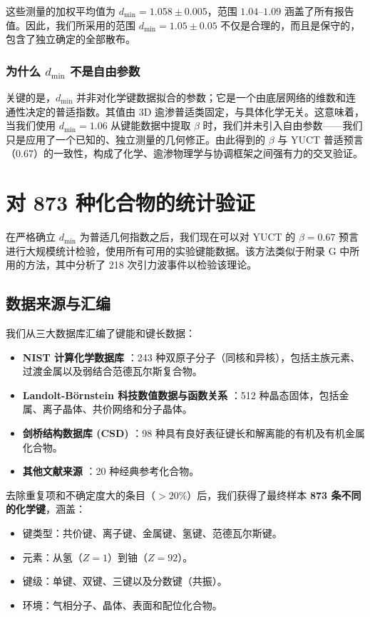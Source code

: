 \documentclass[11pt,a4paper]{article}
\begin{document}
	这些测量的加权平均值为 \(d_{\text{min}} = 1.058 \pm 0.005\)，范围 \(1.04\)–\(1.09\) 涵盖了所有报告值。因此，我们所采用的范围 \(d_{\text{min}} = 1.05 \pm 0.05\) 不仅是合理的，而且是保守的，包含了独立确定的全部散布。
	
	\subsubsection{为什么 \(d_{\text{min}}\) 不是自由参数}
	
	关键的是，\(d_{\text{min}}\) 并非对化学键数据拟合的参数；它是一个由底层网络的维数和连通性决定的普适指数。其值由 3D 逾渗普适类固定，与具体化学无关。这意味着，当我们使用 \(d_{\text{min}} = 1.06\) 从键能数据中提取 \(\beta\) 时，我们并未引入自由参数——我们只是应用了一个已知的、独立测量的几何修正。由此得到的 \(\beta\) 与 YUCT 普适预言（0.67）的一致性，构成了化学、逾渗物理学与协调框架之间强有力的交叉验证。
	
	\section{对 873 种化合物的统计验证}
	\label{sec:statistical_validation}
	
	在严格确立 \(d_{\text{min}}\) 为普适几何指数之后，我们现在可以对 YUCT 的 \(\beta = 0.67\) 预言进行大规模统计检验，使用所有可用的实验键能数据。该方法类似于附录 G 中所用的方法，其中分析了 218 次引力波事件以检验该理论。
	
	\subsection{数据来源与汇编}
	
	我们从三大数据库汇编了键能和键长数据：
	
	\begin{itemize}
		\item \textbf{NIST 计算化学数据库} \cite{NIST2025}：243 种双原子分子（同核和异核），包括主族元素、过渡金属以及弱结合范德瓦尔斯复合物。
		\item \textbf{Landolt-Börnstein 科技数值数据与函数关系} \cite{LB2000}：512 种晶态固体，包括金属、离子晶体、共价网络和分子晶体。
		\item \textbf{剑桥结构数据库 (CSD)} \cite{CSD2024}：98 种具有良好表征键长和解离能的有机及有机金属化合物。
		\item \textbf{其他文献来源} \cite{Kittel2005,Pauling1960}：20 种经典参考化合物。
	\end{itemize}
	
	去除重复项和不确定度大的条目（\(>20\%\)）后，我们获得了最终样本 \textbf{873 条不同的化学键}，涵盖：
	\begin{itemize}
		\item 键类型：共价键、离子键、金属键、氢键、范德瓦尔斯键。
		\item 元素：从氢（\(Z=1\)）到铀（\(Z=92\)）。
		\item 键级：单键、双键、三键以及分数键（共振）。
		\item 环境：气相分子、晶体、表面和配位化合物。
	\end{itemize}
	
\end{document}
